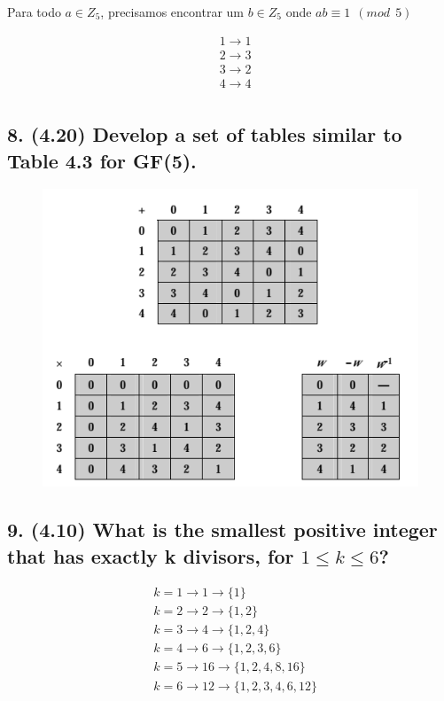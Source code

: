 \documentclass[fleqn, 12pt]{article}
\begin{document}
    Para todo $a \in Z_5$, precisamos encontrar um $b \in Z_5$ onde $ab \equiv 1 \ \ (mod \ \ 5)$

    \begin{align*}
      & 1 \rightarrow 1 \\
      & 2 \rightarrow 3 \\
      & 3 \rightarrow 2 \\
      & 4 \rightarrow 4 \\
    \end{align*}

\subsection*{8. (4.20) Develop a set of tables similar to Table 4.3 for GF(5).}
  \begin{figure}[h]
    \includegraphics[width=\linewidth]{quatro_vinte}
  \end{figure}

\subsection*{9. (4.10) What is the smallest positive integer that has exactly k divisors, for $1 \leq k \leq 6$?}
  \begin{align*}
    & k = 1 \rightarrow 1 \rightarrow \lbrace 1 \rbrace \\
    & k = 2 \rightarrow 2 \rightarrow \lbrace 1, 2 \rbrace \\
    & k = 3 \rightarrow 4 \rightarrow \lbrace 1, 2, 4 \rbrace \\
    & k = 4 \rightarrow 6 \rightarrow \lbrace 1, 2, 3, 6 \rbrace \\
    & k = 5 \rightarrow 16 \rightarrow \lbrace 1, 2, 4, 8, 16 \rbrace \\
    & k = 6 \rightarrow 12 \rightarrow \lbrace 1, 2, 3, 4, 6, 12 \rbrace \\
  \end{align*}
\end{document}
